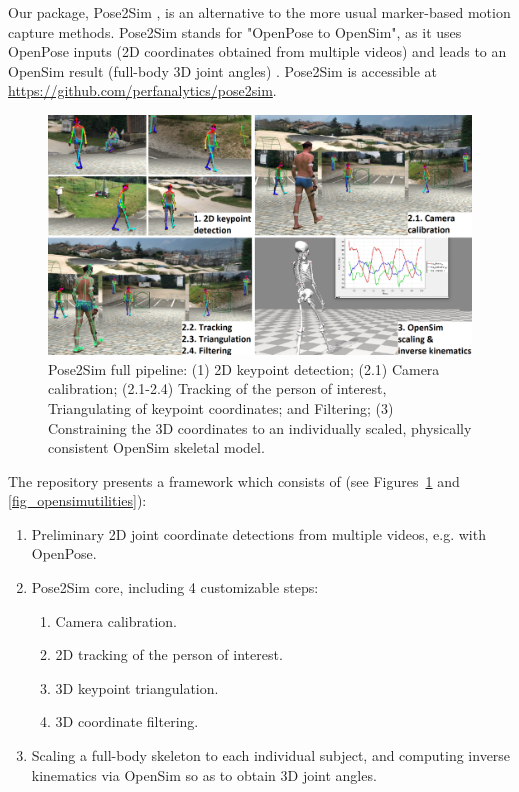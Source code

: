 Our package, Pose2Sim \cite{Pagnon2022b}, is an alternative to the more usual marker-based motion capture methods. Pose2Sim stands for "OpenPose to OpenSim", as it uses OpenPose inputs (2D coordinates obtained from multiple videos) \cite{Cao2019} and leads to an OpenSim result (full-body 3D joint angles) \cite{Delp2007,Seth2018}. Pose2Sim is accessible at \url{https://github.com/perfanalytics/pose2sim}.

\begin{figure}[hbtp]
	\centering
	\def\svgwidth{1\columnwidth}
	\fontsize{10pt}{10pt}\selectfont
	\includegraphics[width=\linewidth]{"../Chap3/Figures/Fig_Pipeline.png"}
	\caption{Pose2Sim full pipeline: (1) 2D keypoint detection; (2.1) Camera calibration; \newline(2.1-2.4) Tracking of the person of interest, Triangulating of keypoint coordinates; and Filtering; (3) Constraining the 3D coordinates to an individually scaled, physically consistent OpenSim skeletal model.}
	\label{fig_pipeline}
\end{figure}

\newpage

The repository presents a framework which consists of (see Figures~\ref{fig_pipeline} and \ref{fig_opensimutilities}):
\begin{enumerate}[itemsep=0em, topsep=0em, leftmargin=*]
      \item Preliminary 2D joint coordinate detections from multiple videos, e.g. with OpenPose.
      \item Pose2Sim core, including 4 customizable steps:
      \begin{enumerate}[before=\vspace{-0.5\baselineskip}, nosep, label*=\arabic*.]
            \item Camera calibration.
            \item 2D tracking of the person of interest.
            \item 3D keypoint triangulation.
            \item 3D coordinate filtering.
      \end{enumerate}
      \item Scaling a full-body skeleton to each individual subject, and computing inverse kinematics via OpenSim so as to obtain 3D joint angles.
\end{enumerate}

